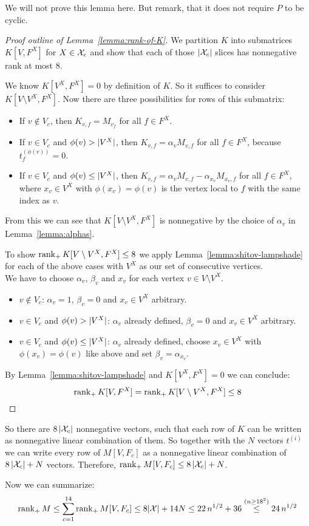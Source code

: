 We will not prove this lemma here. But remark, that it does not require $P$ to be cyclic.

\begin{proof}[Proof outline of Lemma~\ref{lemma:rank-of-K}]
  We partition $K$ into submatrices $K[V,F^X]$ for $X \in \mathcal{X}_c$ and show that each of those $\lvert\mathcal{X}_c\rvert$ slices has nonnegative rank at most $8$.

  We know $K[V^X,F^X] = 0$ by definition of $K$. So it suffices to consider $K[V \setminus V^X, F^X]$. Now there are three possibilities for rows of this submatrix:

  \begin{itemize}
    \item If $v \notin V_c$, then $K_{v,f} = M_{v_f}$ for all $f \in F^X$.
    \item If $v \in V_c$ and $\phi(v) > \lvert V^X\rvert$, then $K_{v,f} = \alpha_v M_{v,f}$ for all $f \in F^X$, because $t_f^{(\phi(v))} = 0$.
    \item If $v \in V_c$ and $\phi(v) \leq \lvert V^X\rvert$, then $K_{v,f} = \alpha_v M_{v,f} - \alpha_{x_v} M_{x_v,f}$ for all $f \in F^X$, where $x_v \in V^X$ with $\phi(x_v) = \phi(v)$ is the vertex local to $f$ with the same index as $v$.
  \end{itemize}

  From this we can see that $K[V \setminus V^X, F^X]$ is nonnegative by the choice of $\alpha_v$ in Lemma~\ref{lemma:alphas}.

  To show $\operatorname{rank}_+ K[V \setminus V^X, F^X] \leq 8$ we apply Lemma~\ref{lemma:shitov-lampshade} for each of the above cases with $V^X$ as our set of consecutive vertices.\\
  We have to choose $\alpha_v$, $\beta_v$ and $x_v$ for each vertex $v \in V \setminus V^X$.

  \begin{itemize}
    \item $v \notin V_c$: $\alpha_v = 1$, $\beta_v = 0$ and $x_v \in V^X$ arbitrary.
    \item $v \in V_c$ and $\phi(v) > \lvert V^X\rvert$: $\alpha_v$ already defined, $\beta_v = 0$ and $x_v \in V^X$ arbitrary.
    \item $v \in V_c$ and $\phi(v) \leq \lvert V^X\rvert$: $\alpha_v$ already defined, choose $x_v \in V^X$ with $\phi(x_v) = \phi(v)$ like above and set $\beta_v = \alpha_{x_v}$.
  \end{itemize}

  By Lemma~\ref{lemma:shitov-lampshade} and $K[V^X,F^X] = 0$ we can conclude: $$\operatorname{rank}_+ K[V,F^X] = \operatorname{rank}_+ K[V \setminus V^X,F^X] \leq 8$$
\end{proof}

So there are $8\,\lvert\mathcal{X}_c\rvert$ nonnegative vectors, such that each row of $K$ can be written as nonnegative linear combination of them. So together with the $N$ vectors $t^{(i)}$ we can write every row of $M[V,F_c]$ as a nonnegative linear combination of $8\,\lvert\mathcal{X}_c\rvert + N$ vectors. Therefore, $\operatorname{rank}_+ M[V,F_c] \leq 8\,\lvert\mathcal{X}_c\rvert + N$.

Now we can summarize: $$\operatorname{rank}_+ M \leq \sum_{c=1}^{14} \operatorname{rank}_+ M[V,F_c] \leq 8\lvert\mathcal{X}\rvert + 14N \leq 22\,n^{1/2} + 36 \stackrel{(n \geq 18^2)}{\leq} 24\,n^{1/2}$$
